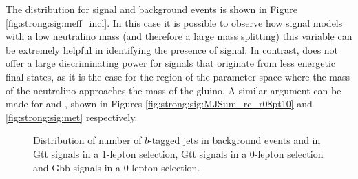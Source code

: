 The \meff distribution for signal and background events is shown in Figure \ref{fig:strong:sig:meff_incl}. 
In this case it is possible to observe how signal models with a low neutralino mass (and therefore a large mass splitting)
this variable can be extremely helpful in identifying the presence of signal. 
In contrast, \meff does not offer a large discriminating power for signals that originate from less energetic final states, as it is the 
case for the region of the parameter space where the mass of the neutralino approaches the mass of the gluino.
A similar argument can be made for \mjsum and \met, shown in Figures \ref{fig:strong:sig:MJSum_rc_r08pt10} and \ref{fig:strong:sig:met} respectively. 


\begin{figure}[htbp]
\centering 
{}
\caption{Distribution of number of $b$-tagged jets in background events and in  Gtt signals in a 1-lepton selection,
 Gtt signals in a 0-lepton selection and
 Gbb signals in a 0-lepton selection.
}\label{fig:strong:sig:bjets_n}
\end{figure}

